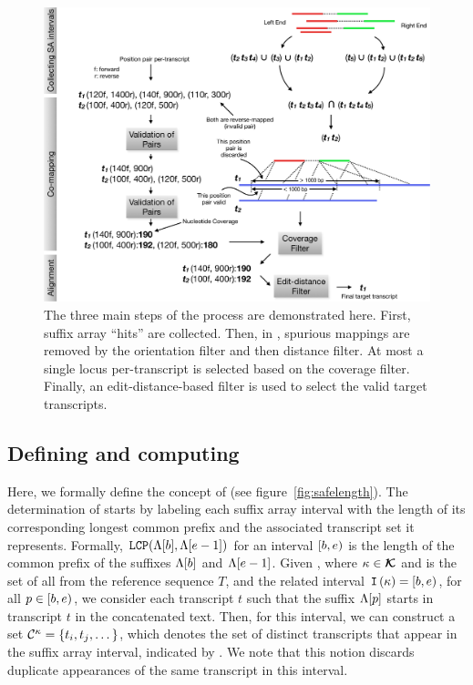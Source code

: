 \begin{figure}%
 \centering
 \includegraphics[scale=0.3]{Figures/sla/overview}
 \caption[The main steps of the \sla process]{The three main steps of the \sla 
 process are demonstrated here. First, suffix array ``hits'' are collected. Then, 
 in \cm, spurious mappings are removed by the orientation filter and then distance 
 filter. At most a single locus per-transcript is selected based on the coverage filter. 
 Finally, an edit-distance-based filter is used to select the valid target transcripts.
 }
  \label{fig:block_overview}
\end{figure}

\subsection{Defining and computing \kslcps}\label{sec:safelength}
Here, we formally define the concept of \kslcps (see figure~\cref{fig:safelength}). 
The determination of \kslcps starts by labeling each suffix array interval with the 
length of its corresponding longest common prefix and the associated transcript set it 
represents. Formally, $\texttt{LCP}(\Lambda{[b]}, \Lambda{[e-1]})$ for an interval 
$\left[b,e\right)$ is the length of the common prefix of the suffixes $\Lambda{[b]}$ 
and $\Lambda{[e-1]}$. Given \kmer \samplekmer, where ${\kappa} \in \bm{\mathcal{K}}$ 
and \allkmers is the set of all \kmers from the reference sequence $T$, and the related 
interval $\texttt{I}\left({\kappa}\right) = \left[b,e\right)$, for all $p \in \left[b,e\right)$, we 
consider each transcript $t$ such that the suffix $\Lambda{[p]}$ starts in transcript 
$t$ in the concatenated text. Then, for this interval, we can construct a set 
$\mathcal{C}^{{\kappa}} =  \{t_{i}, t_{j}, \dots\}$, which denotes the set of distinct 
transcripts that appear in the suffix array interval, indicated by \samplekmer.  We note 
that this notion discards duplicate appearances of the same transcript in this interval.

